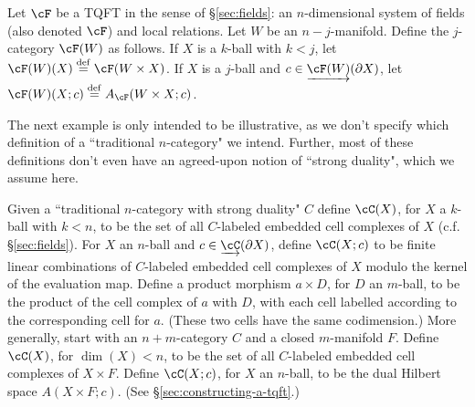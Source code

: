 \begin{example}
\rm
\label{ex:ncats-from-tqfts}%
Let $\cF$ be a TQFT in the sense of \S\ref{sec:fields}: an $n$-dimensional 
system of fields (also denoted $\cF$) and local relations.
Let $W$ be an $n{-}j$-manifold.
Define the $j$-category $\cF(W)$ as follows.
If $X$ is a $k$-ball with $k<j$, let $\cF(W)(X) \deq \cF(W\times X)$.
If $X$ is a $j$-ball and $c\in \cl{\cF(W)}(\bd X)$, 
let $\cF(W)(X; c) \deq A_\cF(W\times X; c)$.
\end{example}

The next example is only intended to be illustrative, as we don't specify 
which definition of a ``traditional $n$-category" we intend.
Further, most of these definitions don't even have an agreed-upon notion of 
``strong duality", which we assume here.
\begin{example}
\rm
\label{ex:traditional-n-categories}
Given a ``traditional $n$-category with strong duality" $C$
define $\cC(X)$, for $X$ a $k$-ball with $k < n$,
to be the set of all $C$-labeled embedded cell complexes of $X$ (c.f. \S \ref{sec:fields}).
For $X$ an $n$-ball and $c\in \cl{\cC}(\bd X)$, define $\cC(X; c)$ to be finite linear
combinations of $C$-labeled embedded cell complexes of $X$
modulo the kernel of the evaluation map.
Define a product morphism $a\times D$, for $D$ an $m$-ball, to be the product of the cell complex of $a$ with $D$,
with each cell labelled according to the corresponding cell for $a$.
(These two cells have the same codimension.)
More generally, start with an $n{+}m$-category $C$ and a closed $m$-manifold $F$.
Define $\cC(X)$, for $\dim(X) < n$,
to be the set of all $C$-labeled embedded cell complexes of $X\times F$.
Define $\cC(X; c)$, for $X$ an $n$-ball,
to be the dual Hilbert space $A(X\times F; c)$.
(See \S\ref{sec:constructing-a-tqft}.)
\end{example}



